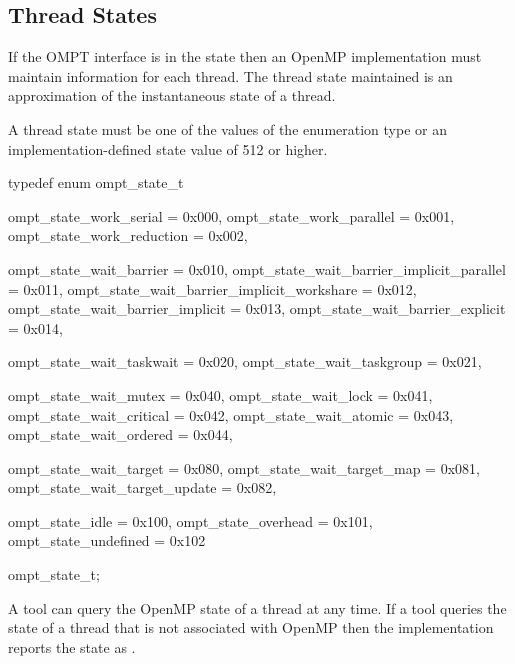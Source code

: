 \subsection{Thread States}
\label{sec:thread-states}
\label{sec:ompt_state_t}

\summary
If the OMPT interface is in the  state then an OpenMP implementation
must maintain  information for each thread. The thread 
state maintained is an approximation of the instantaneous state of a thread.

\format
\begin{ccppspecific}
A thread state must be one of the values of the enumeration type 
 or an implementation-defined state value of 512 or higher.

\begin{ompcEnum}
typedef enum ompt_state_t {
  ompt_state_work_serial                      = 0x000,
  ompt_state_work_parallel                    = 0x001,
  ompt_state_work_reduction                   = 0x002,

  ompt_state_wait_barrier                     = 0x010,
  ompt_state_wait_barrier_implicit_parallel   = 0x011,
  ompt_state_wait_barrier_implicit_workshare  = 0x012,
  ompt_state_wait_barrier_implicit            = 0x013,
  ompt_state_wait_barrier_explicit            = 0x014,

  ompt_state_wait_taskwait                    = 0x020,
  ompt_state_wait_taskgroup                   = 0x021,

  ompt_state_wait_mutex                       = 0x040,
  ompt_state_wait_lock                        = 0x041,
  ompt_state_wait_critical                    = 0x042,
  ompt_state_wait_atomic                      = 0x043,
  ompt_state_wait_ordered                     = 0x044,

  ompt_state_wait_target                      = 0x080,
  ompt_state_wait_target_map                  = 0x081,
  ompt_state_wait_target_update               = 0x082,

  ompt_state_idle                             = 0x100,
  ompt_state_overhead                         = 0x101,
  ompt_state_undefined                        = 0x102
} ompt_state_t;
\end{ompcEnum}
\end{ccppspecific}

\descr
A tool can query the OpenMP state of a thread at any time. If a 
tool queries the state of a thread that is not associated with OpenMP
then the implementation reports the state as .

